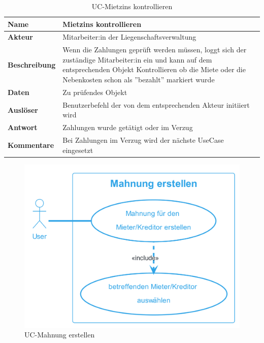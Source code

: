 \begin{table}[H]
  \centering
  \settowidth{}
  \setlength\extrarowheight{2pt}
  \begin{tabulary}{1.0\textwidth}{|a|m{14cm}|}
    \hline
    \textbf{Name}& Mietzins kontrollieren\\
    \hline
    \textbf{Akteur}& Mitarbeiter:in der Liegenschaftsverwaltung\\
    \hline 
    \textbf{Beschreibung} & Wenn die Zahlungen geprüft werden müssen, loggt sich der zuständige Mitarbeiter:in ein und kann auf dem entsprechenden Objekt Kontrollieren ob die Miete oder die Nebenkosten schon als ''bezahlt'' markiert wurde\\
    \hline
    \textbf{Daten} & Zu prüfendes Objekt\\
    \hline
    \textbf{Auslöser} & Benutzerbefehl der von dem entsprechenden Akteur initiiert wird\\
    \hline
    \textbf{Antwort} & Zahlungen wurde getätigt oder im Verzug\\
    \hline
    \textbf{Kommentare} & Bei Zahlungen im Verzug wird der nächste UseCase  eingesetzt\\
    \hline
  \end{tabulary}
  \caption{UC-Mietzins kontrollieren}
\end{table}

\newpage

\begin{figure}[H]
  \begin{center}
    \includegraphics[width=0.5\linewidth]{content/diagrams/out/usecase/mahnungGenerieren/MahnungErstellen.png}
    \caption{UC-Mahnung erstellen}
    \label{mahnung}
  \end{center}
\end{figure}

